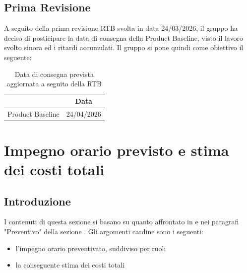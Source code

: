 \documentclass[a4paper,12pt]{article}
\begin{document}
    \subsection{Prima Revisione}
        A seguito della prima revisione RTB svolta in data 24/03/2026, il gruppo ha deciso di posticipare la data di consegna della Product Baseline, visto il lavoro svolto sinora ed i ritardi accumulati.
        Il gruppo si pone quindi come obiettivo il seguente:

         \begin{table}[H]
             \centering
             \begin{tabular}{|c|c|}
            \hline
                \rowcolor{lightgray}{\textbf{Revisione}} & {\textbf{Data}}  \\
            \hline
                 Product Baseline & 24/04/2026\\
            \hline
             \end{tabular}
             \caption{Data di consegna prevista aggiornata a seguito della RTB}
             \label{tab:cal2}
        \end{table}

\newpage
\section{Impegno orario previsto e stima dei costi totali}
    \subsection{Introduzione}
        I contenuti di questa sezione si basano su quanto affrontato in \textbf{} e nei paragrafi "Preventivo" della sezione \textbf{}. Gli argomenti cardine sono i seguenti:
        \begin{itemize}
            \item l'impegno orario preventivato, suddiviso per ruoli
            \item la conseguente stima dei costi totali 
        \end{itemize}
\end{document}
